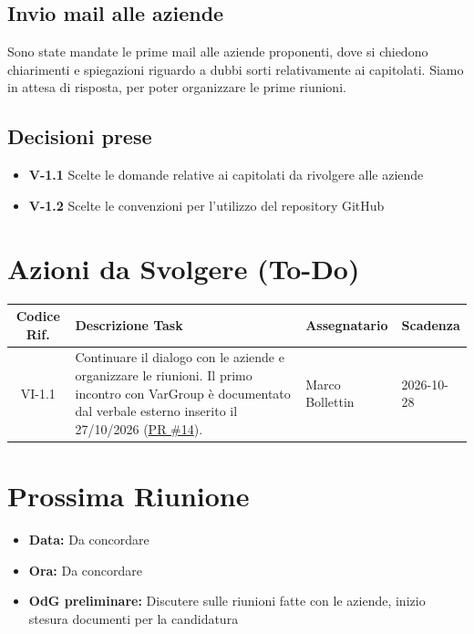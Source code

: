 \documentclass[a4paper, 11pt]{article}
\begin{document}
\subsection{Invio mail alle aziende}
Sono state mandate le prime mail alle aziende proponenti, dove si chiedono chiarimenti e spiegazioni riguardo a dubbi sorti relativamente ai capitolati. Siamo in attesa di risposta, per poter organizzare le prime riunioni.

\subsection{Decisioni prese}
\begin{itemize}
    \item \textbf{V-1.1} Scelte le domande relative ai capitolati da rivolgere alle aziende
    \item \textbf{V-1.2} Scelte le convenzioni per l'utilizzo del repository GitHub
\end{itemize}

\vspace{0.5cm}
\section{Azioni da Svolgere (To-Do)}
\begin{tabularx}{\textwidth}{|c|X|l|l|}
\hline
\textbf{Codice Rif.} & \textbf{Descrizione Task} & \textbf{Assegnatario} & \textbf{Scadenza} \\ \hline
VI-1.1 & Continuare il dialogo con le aziende e organizzare le riunioni. Il primo incontro con VarGroup è documentato dal verbale esterno inserito il 27/10/2026 (\href{https://github.com/BitCrusher-Team/Progetto_SWE_26-27/pull/14}{PR \#14}). & Marco Bollettin & 2026-10-28 \\ \hline


\end{tabularx}

\vspace{0.5cm}
\section{Prossima Riunione}
\begin{itemize}
    \item \textbf{Data:}  Da concordare
    \item \textbf{Ora:} Da concordare
    \item \textbf{OdG preliminare:} Discutere sulle riunioni fatte con le aziende, inizio stesura documenti per la candidatura
\end{itemize}
\end{document}
